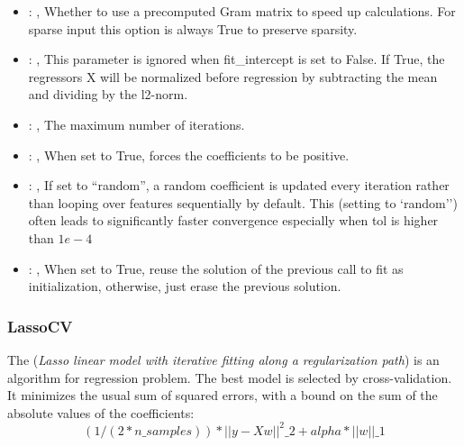 \begin{itemize}
    \item {}: , 
      Whether to use a precomputed Gram matrix to speed up calculations.
      For sparse input this option is always True to preserve sparsity.

    \item {}: , 
      This parameter is ignored when fit\_intercept is set to False. If True,
      the regressors X will be normalized before regression by subtracting the mean and
      dividing by the l2-norm.

    \item {}: , 
      The maximum number of iterations.

    \item {}: , 
      When set to True, forces the coefficients to be positive.

    \item {}: , 
      If set to ``random'', a random coefficient is updated every iteration
      rather than looping over features sequentially by default. This (setting to `random'')
      often leads to significantly faster convergence especially when tol is higher than $1e-4$

    \item {}: , 
      When set to True, reuse the solution of the previous call
      to fit as initialization, otherwise, just erase the previous solution.
  \end{itemize}


\subsubsection{LassoCV}
  The  (\textit{Lasso linear model with iterative fitting along a regularization
  path})                         is an algorithm for regression problem. The best model is selected
  by cross-validation.                         It minimizes the usual sum of squared errors, with a
  bound on the sum of the                         absolute values of the coefficients:
  \begin{equation}                          (1 / (2 * n\_samples)) * ||y - Xw||^2\_2 + alpha *
  ||w||\_1                         \end{equation}

